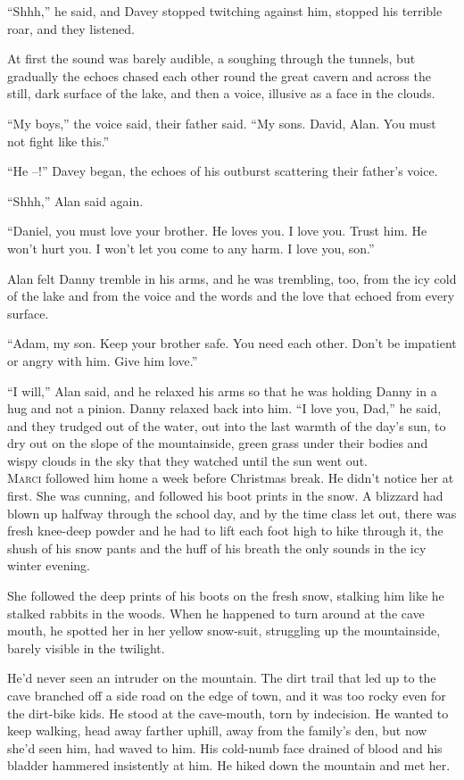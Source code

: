 \documentclass{article}
\begin{document}
``Shhh,'' he said, and Davey stopped twitching against him, stopped
his terrible roar, and they listened.

At first the sound was barely audible, a soughing through the tunnels,
but gradually the echoes chased each other round the great cavern and
across the still, dark surface of the lake, and then a voice, illusive
as a face in the clouds.

``My boys,'' the voice said, their father said.  ``My sons.  David,
Alan.  You must not fight like this.''

``He --!'' Davey began, the echoes of his outburst scattering their
father's voice.

``Shhh,'' Alan said again.

``Daniel, you must love your brother.  He loves you.  I love you. 
Trust him.  He won't hurt you.  I won't let you come to any harm.  I
love you, son.''

Alan felt Danny tremble in his arms, and he was trembling, too, from
the icy cold of the lake and from the voice and the words and the love
that echoed from every surface.

``Adam, my son.  Keep your brother safe.  You need each other.  Don't
be impatient or angry with him.  Give him love.''

``I will,'' Alan said, and he relaxed his arms so that he was holding
Danny in a hug and not a pinion.  Danny relaxed back into him.  ``I
love you, Dad,'' he said, and they trudged out of the water, out into
the last warmth of the day's sun, to dry out on the slope of the
mountainside, green grass under their bodies and wispy clouds in the
sky that they watched until the sun went out.
\\
\lettrine[lines=3, lhang=.5, nindent=0pt, findent=2pt]{M}{arci} followed him home a week before Christmas break.  He didn't
notice her at first.  She was cunning, and followed his boot prints in
the snow.  A blizzard had blown up halfway through the school day, and
by the time class let out, there was fresh knee-deep powder and he had
to lift each foot high to hike through it, the shush of his snow pants
and the huff of his breath the only sounds in the icy winter evening.

She followed the deep prints of his boots on the fresh snow, stalking
him like he stalked rabbits in the woods.  When he happened to turn
around at the cave mouth, he spotted her in her yellow snow-suit,
struggling up the mountainside, barely visible in the twilight.

He'd never seen an intruder on the mountain.  The dirt trail that led
up to the cave branched off a side road on the edge of town, and it
was too rocky even for the dirt-bike kids.  He stood at the
cave-mouth, torn by indecision.  He wanted to keep walking, head away
farther uphill, away from the family's den, but now she'd seen him,
had waved to him.  His cold-numb face drained of blood and his bladder
hammered insistently at him.  He hiked down the mountain and met her.
\end{document}

